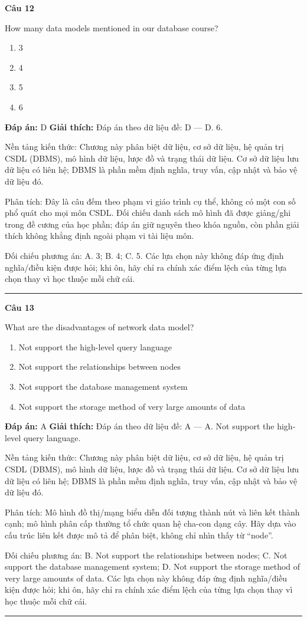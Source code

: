 \documentclass[11pt,a4paper]{article}
\newenvironment{question}[1]{%
  \par\vspace{1em}\noindent\textbf{\large Câu #1}\par\vspace{0.4em}
}{%
  \par\vspace{1em}\hrule\vspace{0.6em}
}
\newenvironment{choices}{%
  \begin{enumerate}[label=\textbf{\Alph*.},leftmargin=2.2em,itemsep=2pt,topsep=3pt]
}{%
  \end{enumerate}
}
\newcommand{\choice}{\item}
\begin{document}
\begin{question}{12}
How many data models mentioned in our database course?
\begin{choices}
\choice 3
\choice 4
\choice 5
\choice 6
\end{choices}
\textbf{Đáp án:} D
\textbf{Giải thích:} Đáp án theo dữ liệu đề: D — D. 6.

Nền tảng kiến thức: Chương này phân biệt dữ liệu, cơ sở dữ liệu, hệ quản trị CSDL (DBMS), mô hình dữ liệu, lược đồ và trạng thái dữ liệu. Cơ sở dữ liệu lưu dữ liệu có liên hệ; DBMS là phần mềm định nghĩa, truy vấn, cập nhật và bảo vệ dữ liệu đó.

Phân tích: Đây là câu đếm theo phạm vi giáo trình cụ thể, không có một con số phổ quát cho mọi môn CSDL. Đối chiếu danh sách mô hình đã được giảng/ghi trong đề cương của học phần; đáp án giữ nguyên theo khóa nguồn, còn phần giải thích không khẳng định ngoài phạm vi tài liệu môn.

Đối chiếu phương án: A. 3; B. 4; C. 5. Các lựa chọn này không đáp ứng định nghĩa/điều kiện được hỏi; khi ôn, hãy chỉ ra chính xác điểm lệch của từng lựa chọn thay vì học thuộc mỗi chữ cái.
\end{question}


\begin{question}{13}
What are the disadvantages of network data model?
\begin{choices}
\choice Not support the high-level query language
\choice Not support the relationships between nodes
\choice Not support the database management system
\choice Not support the storage method of very large amounts of data
\end{choices}
\textbf{Đáp án:} A
\textbf{Giải thích:} Đáp án theo dữ liệu đề: A — A. Not support the high-level query language.

Nền tảng kiến thức: Chương này phân biệt dữ liệu, cơ sở dữ liệu, hệ quản trị CSDL (DBMS), mô hình dữ liệu, lược đồ và trạng thái dữ liệu. Cơ sở dữ liệu lưu dữ liệu có liên hệ; DBMS là phần mềm định nghĩa, truy vấn, cập nhật và bảo vệ dữ liệu đó.

Phân tích: Mô hình đồ thị/mạng biểu diễn đối tượng thành nút và liên kết thành cạnh; mô hình phân cấp thường tổ chức quan hệ cha-con dạng cây. Hãy dựa vào cấu trúc liên kết được mô tả để phân biệt, không chỉ nhìn thấy từ “node”.

Đối chiếu phương án: B. Not support the relationships between nodes; C. Not support the database management system; D. Not support the storage method of very large amounts of data. Các lựa chọn này không đáp ứng định nghĩa/điều kiện được hỏi; khi ôn, hãy chỉ ra chính xác điểm lệch của từng lựa chọn thay vì học thuộc mỗi chữ cái.
\end{question}
\end{document}

